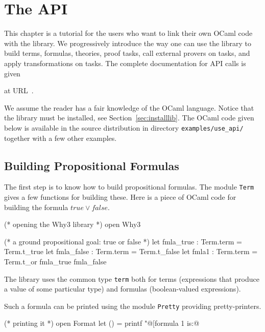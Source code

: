 \chapter{The \why API}
\label{chap:api}

This chapter is a tutorial for the users who want to link their own
OCaml code with the \why library. We progressively introduce the way
one can use the library to build terms, formulas, theories, proof
tasks, call external provers on tasks, and apply transformations on
tasks. The complete documentation for API calls is given\begin{latexonly}
at URL~\urlapi{}.\end{latexonly}

We assume the reader has a fair knowledge of the OCaml
language. Notice that the \why library must be installed, see
Section~\ref{sec:installlib}. The OCaml code given below is available in
the source distribution in directory \verb|examples/use_api/| together
with a few other examples.


\section{Building Propositional Formulas}

The first step is to know how to build propositional formulas. The
module \texttt{Term} gives a few functions for building these. Here is
a piece of OCaml code for building the formula $\mathit{true} \lor
\mathit{false}$.
\begin{ocamlcode}
(* opening the Why3 library *)
open Why3

(* a ground propositional goal: true or false *)
let fmla_true : Term.term = Term.t_true
let fmla_false : Term.term = Term.t_false
let fmla1 : Term.term = Term.t_or fmla_true fmla_false
\end{ocamlcode}
The library uses the common type \texttt{term} both for terms
(\ie expressions that produce a value of some particular type)
and formulas (\ie boolean-valued expressions).

Such a formula can be printed using the module \texttt{Pretty}
providing pretty-printers.
\begin{ocamlcode}
(* printing it *)
open Format
let () = printf "@[formula 1 is:@ %
\end{ocamlcode}

